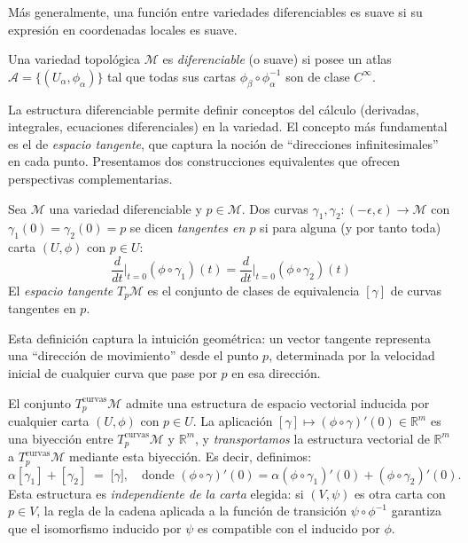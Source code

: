 Más generalmente, una función entre variedades diferenciables es suave si su expresión en coordenadas locales es suave.

\begin{definition}\label{def:variedad_diferenciable}
Una variedad topológica $\mathcal{M}$ es \textit{diferenciable} (o suave) si posee un atlas $\mathcal{A} = \{(U_\alpha, \phi_\alpha)\}$ tal que todas sus cartas $\phi_\beta \circ \phi_\alpha^{-1}$ son de clase $C^\infty$.
\end{definition}

La estructura diferenciable permite definir conceptos del cálculo (derivadas, integrales, ecuaciones diferenciales) en la variedad. El concepto más fundamental es el de \textit{espacio tangente}, que captura la noción de ``direcciones infinitesimales'' en cada punto. Presentamos dos construcciones equivalentes que ofrecen perspectivas complementarias.

\begin{definition}\label{def:espacio_tangente_curvas}
Sea $\mathcal{M}$ una variedad diferenciable y $p \in \mathcal{M}$. Dos curvas $\gamma_1, \gamma_2: (-\epsilon, \epsilon) \to \mathcal{M}$ con $\gamma_1(0) = \gamma_2(0) = p$ se dicen \textit{tangentes en $p$} si para alguna (y por tanto toda) carta $(U, \phi)$ con $p \in U$:
\[
\frac{d}{dt}\bigg|_{t=0} (\phi \circ \gamma_1)(t) = \frac{d}{dt}\bigg|_{t=0} (\phi \circ \gamma_2)(t)
\]
El \textit{espacio tangente} $T_p\mathcal{M}$ es el conjunto de clases de equivalencia $[\gamma]$ de curvas tangentes en $p$.
\end{definition}

Esta definición captura la intuición geométrica: un vector tangente representa una ``dirección de movimiento'' desde el punto $p$, determinada por la velocidad inicial de cualquier curva que pase por $p$ en esa dirección.

\begin{remark}\label{rem:estructura_vectorial_curvas}
El conjunto $T_p^{\text{curvas}}\mathcal{M}$ admite una estructura de espacio vectorial inducida por cualquier carta $(U, \phi)$ con $p \in U$. La aplicación $[\gamma] \mapsto (\phi \circ \gamma)'(0) \in \mathbb{R}^m$ es una biyección entre $T_p^{\text{curvas}}\mathcal{M}$ y $\mathbb{R}^m$, y \textit{transportamos} la estructura vectorial de $\mathbb{R}^m$ a $T_p^{\text{curvas}}\mathcal{M}$ mediante esta biyección. Es decir, definimos:
\[
\alpha[\gamma_1] + [\gamma_2] \;=\; \bigl[\gamma\bigr], \quad \text{donde $(\phi \circ \gamma)'(0) = \alpha(\phi \circ \gamma_1)'(0) + (\phi \circ \gamma_2)'(0)$}.
\]
Esta estructura es \textit{independiente de la carta} elegida: si $(V, \psi)$ es otra carta con $p \in V$, la regla de la cadena aplicada a la función de transición $\psi \circ \phi^{-1}$ garantiza que el isomorfismo inducido por $\psi$ es compatible con el inducido por $\phi$.
\end{remark}

